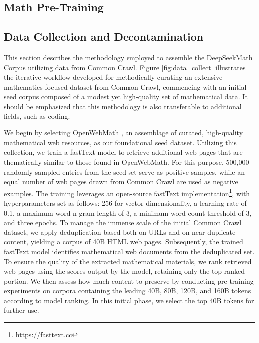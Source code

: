 \begin{itemize}[topsep=0pt]
\section{Math Pre-Training}

\subsection{Data Collection and Decontamination} This section describes the methodology employed to assemble the DeepSeekMath Corpus utilizing data from Common Crawl. Figure \ref{fig:data_collect} illustrates the iterative workflow developed for methodically curating an extensive mathematics-focused dataset from Common Crawl, commencing with an initial seed corpus composed of a modest yet high-quality set of mathematical data. It should be emphasized that this methodology is also transferable to additional fields, such as coding.

We begin by selecting OpenWebMath \citep{openwebmath}, an assemblage of curated, high-quality mathematical web resources, as our foundational seed dataset. Utilizing this collection, we train a fastText model \citep{joulin2016fasttext} to retrieve additional web pages that are thematically similar to those found in OpenWebMath. For this purpose, 500,000 randomly sampled entries from the seed set serve as positive samples, while an equal number of web pages drawn from Common Crawl are used as negative examples. The training leverages an open-source fastText implementation\footnote{\url{https://fasttext.cc}}, with hyperparameters set as follows: 256 for vector dimensionality, a learning rate of 0.1, a maximum word n-gram length of 3, a minimum word count threshold of 3, and three epochs. To manage the immense scale of the initial Common Crawl dataset, we apply deduplication based both on URLs and on near-duplicate content, yielding a corpus of 40B HTML web pages. Subsequently, the trained fastText model identifies mathematical web documents from the deduplicated set. To ensure the quality of the extracted mathematical materials, we rank retrieved web pages using the scores output by the model, retaining only the top-ranked portion. We then assess how much content to preserve by conducting pre-training experiments on corpora containing the leading 40B, 80B, 120B, and 160B tokens according to model ranking. In this initial phase, we select the top 40B tokens for further use.


\end{itemize}
